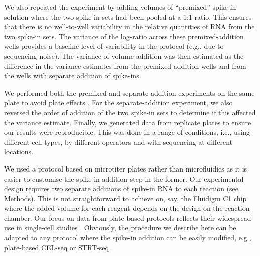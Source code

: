 \documentclass{article}
\begin{document}
We also repeated the experiment by adding volumes of ``premixed'' spike-in solution where the two spike-in sets had been pooled at a 1:1 ratio.
This ensures that there is no well-to-well variability in the relative quantities of RNA from the two spike-in sets.
The variance of the log-ratio across these premixed-addition wells provides a baseline level of variability in the protocol (e.g., due to sequencing noise).
The variance of volume addition was then estimated as the difference in the variance estimates from the premixed-addition wells and from the wells with separate addition of spike-ins.

We performed both the premixed and separate-addition experiments on the same plate to avoid plate effects \cite{hicks2015widespread,tung2016batch}.
For the separate-addition experiment, we also reversed the order of addition of the two spike-in sets to determine if this affected the variance estimate.
Finally, we generated data from replicate plates to ensure our results were reproducible.
This was done in a range of conditions, i.e., using different cell types, by different operators and with sequencing at different locations.

We used a protocol based on microtiter plates rather than microfluidics as it is easier to customise the spike-in addition step in the former.
Our experimental design requires two separate additions of spike-in RNA to each reaction (see Methods).
This is not straightforward to achieve on, say, the Fluidigm C1 chip where the added volume for each reagent depends on the design on the reaction chamber.
Our focus on data from plate-based protocols reflects their widespread use in single-cell studies \cite{segerstople2016single,islam2011characterization,wilson2015combined,scialdone2016resolving}.
Obviously, the procedure we describe here can be adapted to any protocol where the spike-in addition can be easily modified, e.g., plate-based CEL-seq \cite{hashimshony2016celseq2} or STRT-seq \cite{islam2011characterization}.
\end{document}
